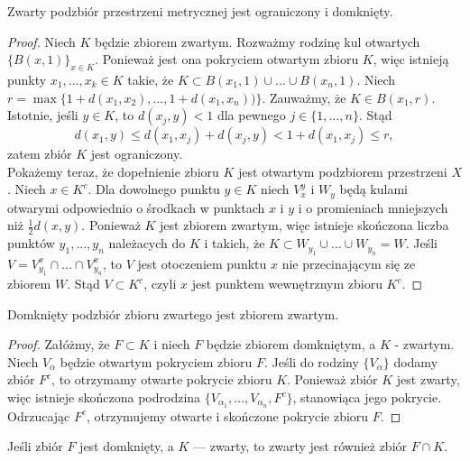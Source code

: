 \documentclass[leqno]{article}
\newcounter{wniosekcounter}
\begin{document}
\begin{justify}
\begin{theorem}
    Zwarty podzbiór przestrzeni metrycznej jest ograniczony i domknięty.
\end{theorem}

\begin{proof}
    Niech $K$ będzie zbiorem zwartym. Rozważmy rodzinę kul otwartych $\{B(x, 1)\}_{x \in K}$.
    Ponieważ jest ona pokryciem otwartym zbioru $K$, więc istnieją punkty $x_1, \ldots, x_k \in K$ takie, że
    $K \subset B(x_1, 1) \cup \ldots \cup B(x_n, 1)$. Niech $r = \max\{1 + d(x_1, x_2), \ldots, 1 + d(x_1, x_n))\}$.
    Zauważmy, że $K \in B(x_1, r)$. Istotnie, jeśli $y \in K$, to $d(x_j, y) < 1$ dla pewnego $j \in \{1, \ldots, n\}$. Stąd 
    \[
        d(x_1, y) \leqslant d(x_1, x_j) + d(x_j, y) < 1 + d(x_1, x_j) \leqslant r,
    \]
    zatem zbiór $K$ jest ograniczony. \\
    Pokażemy teraz, że dopełnienie zbioru $K$ jest otwartym podzbiorem przestrzeni $X$.
    Niech $x \in K^c$. Dla dowolnego punktu $y \in K$ niech $V_x^y$ i $W_y$ będą kulami otwarymi odpowiednio o środkach w punktach 
    $x$ i $y$ i o promieniach mniejszych niż $\frac{1}{2}d(x, y)$. Ponieważ $K$ jest zbiorem zwartym, więc istnieje skończona liczba punktów
    $y_1, \ldots, y_n$ należacych do $K$ i takich, że $K \subset W_{y_1} \cup \ldots \cup W_{y_n} = W$.
    Jeśli $V = V_{y_1}^x \cap \ldots \cap V_{y_n}^x$, to $V$ jest otoczeniem punktu $x$ nie przecinającym się ze zbiorem $W$.
    Stąd $V \subset K^c$, czyli $x$ jest punktem wewnętrznym zbioru $K^c$.
\end{proof}

\begin{theorem}
{
    Domknięty podzbiór zbioru zwartego jest zbiorem zwartym. 
}
\end{theorem}

\begin{proof}
    Załóżmy, że $F \subset K$ i niech $F$ będzie zbiorem domkniętym, a $K$ - zwartym.
    Niech $V_\alpha$ będzie otwartym pokryciem zbioru $F$. Jeśli do rodziny $\{V_\alpha\}$ dodamy zbiór
    $F^c$, to otrzymamy otwarte pokrycie zbioru $K$. Ponieważ zbiór $K$ jest zwarty, więc istnieje skończona podrodzina 
    $\{V_{\alpha_1}, \ldots, V_{\alpha_n}, F^c\}$, stanowiąca jego pokrycie. Odrzucając $F^c$, otrzymujemy otwarte i skończone pokrycie zbioru $F$.
\end{proof}

\setcounter{wniosekcounter}{42}
\begin{wniosek}
{
    Jeśli zbiór $F$ jest domknięty, a $K$ --- zwarty, to zwarty jest również zbiór $F \cap K$.
}
\end{wniosek}


\end{justify}
\end{document}
